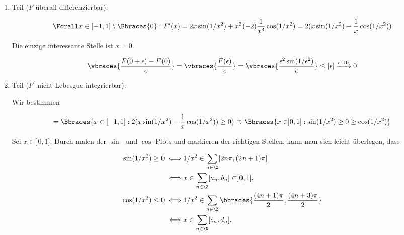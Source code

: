 \begin{solution}

\phantom{}

\begin{enumerate}[label = \arabic*.]

    \item Teil ($F$ überall differenzierbar):
    
    \begin{align*}
        \Forall x \in [-1, 1] \setminus \Bbraces{0}:
            F^\prime(x)
            =
            2 x \sin(1 / x^2) + x^2 (-2) \frac{1}{x^3} \cos(1 / x^2)
            =
            2 (x \sin(1 / x^2) - \frac{1}{x} \cos(1/x^2))
    \end{align*}
    
    Die einzige interessante Stelle ist $x = 0$.

    \begin{align*}
        \vbraces
        {
            \frac{F(0 + \epsilon) - F(0)}{\epsilon}
        }
        =
        \vbraces
        {
            \frac{F(\epsilon)}{\epsilon}
        }
        =
        \vbraces
        {
            \frac{\epsilon^2 \sin(1 / \epsilon^2)}{\epsilon}
        }
        \leq
        |\epsilon|
        \xrightarrow{\epsilon \to 0}
        0
    \end{align*}

    \item Teil ($F^\prime$ nicht Lebesgue-integrierbar):
    
    Wir bestimmen

    \begin{align*}
        [F^\prime \geq 0]
        =
        \Bbraces{x \in [-1, 1]: 2 (x \sin(1 / x^2) - \frac{1}{x} \cos(1 / x^2)) \geq 0}
        \supset
        \Bbraces{x \in ]0, 1]: \sin(1 / x^2) \geq 0 \geq \cos(1 / x^2)}
    \end{align*}

    Sei $x \in ]0, 1]$.
    Durch malen der $\sin$- und $\cos$-Plots und markieren der richtigen Stellen, kann man sich leicht überlegen, dass

    \begin{align*}
        \sin(1 / x^2) \geq 0
        \iff &
        1 / x^2 \in \sum_{n \in \Z} [2 n \pi, (2 n + 1) \pi] \\
        \iff &
        x \in \sum_{n \in \Z} [a_n, b_n] \subset ]0, 1], \\
        \cos(1 / x^2) \leq 0
        \iff &
        1 / x^2 \in \sum_{n \in \Z} \bbraces{\frac{(4 n + 1) \pi}{2}, \frac{(4 n + 3) \pi}{2}} \\
        \iff &
        x \in \sum_{n \in \N} [c_n, d_n],
    \end{align*}


\end{enumerate}
\end{solution}
